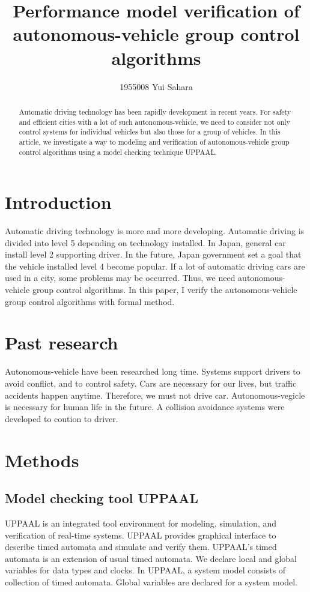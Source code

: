 \documentclass[]{article}
\title{Performance model verification of autonomous-vehicle group control algorithms}
\author{1955008	Yui Sahara}
\date{}
\begin{document}
\maketitle
\begin{abstract}
	Automatic driving technology has been rapidly development in recent years.  For safety and efficient cities with a lot of such autonomous-vehicle, we need to consider not only control systems for individual vehicles but also those for a group of vehicles.  In this article, we investigate a way to modeling and verification of autonomous-vehicle group control algorithms using a model checking technique UPPAAL.
\end{abstract}

\section{Introduction}
	Automatic driving technology is more and more developing.  Automatic driving is divided into level  5 depending on technology installed.  In Japan, general car install level 2 supporting driver.  In the future,  Japan government set a goal that the vehicle installed level 4 become popular.  If a lot of automatic driving cars are used in a city, some problems may be occurred.  Thus, we need autonomous-vehicle group control algorithms.  In this paper, I verify the autonomous-vehicle group control algorithms with formal method.
\section{Past research}
	Autonomous-vehicle have been researched long time.  Systems support drivers to avoid conflict, and to control safety.  Cars are necessary for our lives, but traffic accidents happen anytime.  Therefore, we must not drive car.  Autonomous-vegicle is necessary for human life in the future.  A collision avoidance systems were developed to coution to driver.   
\section{Methods}
	\subsection{Model checking tool UPPAAL}
		UPPAAL is an integrated tool environment for modeling, simulation, and verification of real-time systems.  UPPAAL provides graphical interface to describe timed automata and simulate and verify them. UPPAAL's timed automata is an extension of usual timed automata.  We declare local and global variables for data types and clocks. In UPPAAL, a system model consists of collection of timed automata.  Global variables are declared for a system model.  
\end{document}
